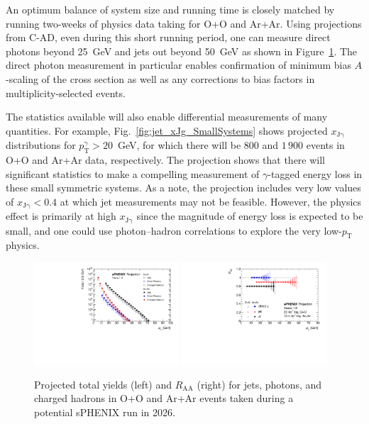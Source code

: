 An optimum balance of system size and running time is closely matched by running two-weeks of physics data taking for O+O and Ar+Ar.   Using projections from C-AD, even during this short running period, one can measure direct photons beyond 25~GeV and jets out beyond 50~GeV as shown in Figure~\ref{fig:jet_RAA_SmallSystems}.   The direct photon measurement in particular enables confirmation of minimum bias $A$-scaling of the cross section as well as any corrections to bias factors in multiplicity-selected events.    

The statistics available will also enable differential measurements of many quantities.  For example, Fig.~\ref{fig:jet_xJg_SmallSystems} shows projected $x_\mathrm{J\gamma}$ distributions for $p_\mathrm{T}^{\gamma} > 20$~GeV, for which there will be $800$ and $1\,900$ events in O+O and Ar+Ar data, respectively. The projection shows that there will significant statistics to make a compelling measurement of $\gamma$-tagged energy loss in these small symmetric systems. As a note, the projection includes very low values of $x_\mathrm{J\gamma} < 0.4$ at which jet measurements may not be feasible. However, the physics effect is primarily at high $x_\mathrm{J\gamma}$ since the magnitude of energy loss is expected to be small, and one could use photon--hadron correlations to explore the very low-$p_\mathrm{T}$ physics.

\begin{figure}[h]
\centering
\includegraphics[width=0.48\textwidth]{figs/master_SmallSystems_yields.pdf}
\includegraphics[width=0.48\textwidth]{figs/RAA_SmallSystems.pdf}
\caption{Projected total yields (left) and $R_\mathrm{AA}$ (right) for
  jets, photons, and charged hadrons in O+O and Ar+Ar events taken during a potential sPHENIX run in 2026.}
\label{fig:jet_RAA_SmallSystems}
\end{figure}

